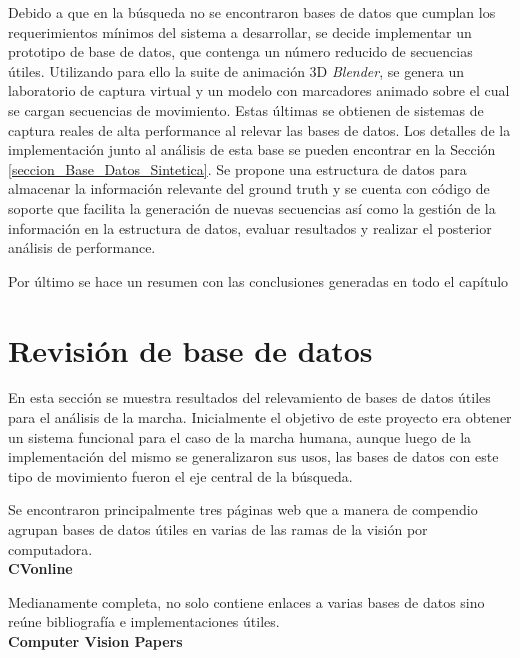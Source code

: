 Debido a que en la búsqueda no se encontraron bases de datos que cumplan los requerimientos mínimos del sistema a desarrollar, se decide implementar un prototipo de base de datos, que contenga un número reducido de secuencias útiles. Utilizando para ello la suite de animación 3D \textit{Blender}, se genera un laboratorio de captura virtual y un modelo con marcadores animado sobre el cual se cargan secuencias de movimiento. Estas últimas se obtienen de sistemas de captura reales de alta performance al relevar las bases de datos. Los detalles de la implementación junto al análisis de esta base se pueden encontrar en la Sección \ref{seccion_Base_Datos_Sintetica}.  
Se propone una estructura de datos para almacenar la información relevante del ground truth y  se cuenta con código de soporte que facilita la generación de nuevas secuencias así como la gestión de la información en la estructura de datos, evaluar resultados y realizar el  posterior análisis de performance.

Por último se hace un resumen con las conclusiones generadas en todo el capítulo

\section{Revisión de base de datos}
\label{seccion_revision_base_datos}
En esta sección se muestra  resultados del relevamiento de bases de datos útiles para el análisis de la marcha.
Inicialmente el objetivo de este proyecto era obtener un sistema funcional para el caso de la marcha humana, aunque luego de la implementación del mismo se generalizaron sus usos, las bases de datos con este tipo de movimiento fueron el eje central de la búsqueda.

Se encontraron principalmente tres páginas web que a manera de compendio agrupan  bases de datos útiles en varias de las ramas de la visión por computadora.\\

\hspace{-0.7cm} \textbf{CVonline \cite{CVonline}} %

Medianamente completa, no solo contiene enlaces a  varias bases de datos sino reúne bibliografía e implementaciones útiles.\\


\hspace{-0.7cm} \textbf{Computer Vision Papers \cite{CVPapers}}  %

